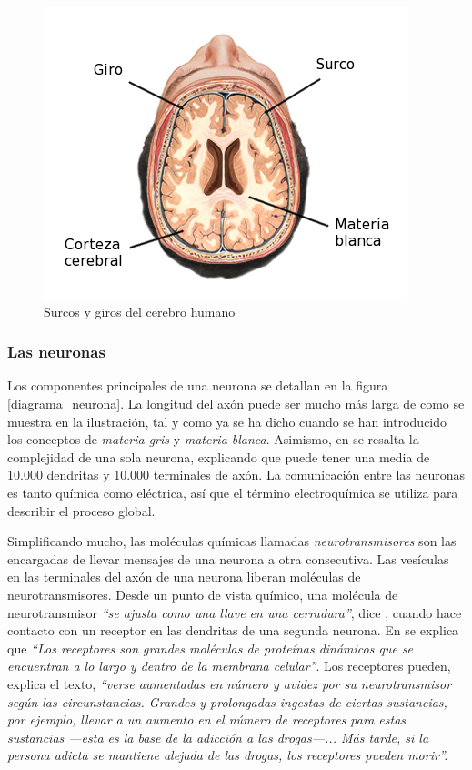 \begin{figure}[h]
  \begin{center}
    \includegraphics[scale=0.8]{images/surcosygiros.jpg}
    \caption{Surcos y giros del cerebro humano}
    \label{surcosygiros}
  \end{center}
\end{figure}

\subsubsection{Las neuronas}

Los componentes principales de una neurona se detallan en la figura \ref{diagrama_neurona}. La longitud del axón puede ser mucho más larga de como se muestra en la ilustración, tal y como ya se ha dicho cuando se han introducido los conceptos de {\it materia gris} y {\it materia blanca}. Asimismo, en \cite{Sapolsky} se resalta la complejidad de una sola neurona, explicando que puede tener una media de 10.000 dendritas y 10.000 terminales de axón. La comunicación entre las neuronas es tanto química como eléctrica, así que el término electroquímica se utiliza para describir el proceso global.

Simplificando mucho, las moléculas químicas llamadas  {\it neurotransmisores} son las encargadas de llevar mensajes de una neurona a otra consecutiva. Las vesículas en las terminales del axón de una neurona liberan moléculas de neurotransmisores. Desde un punto de vista químico, una molécula de neurotransmisor {\it ``se ajusta como una llave en una cerradura''}, dice \cite{Sapolsky}, cuando hace contacto con un receptor en las dendritas de una segunda neurona. En \cite{Restak1995} se explica que {\it ``Los receptores son grandes moléculas de proteínas dinámicos que se encuentran a lo largo y dentro de la membrana celular''}. Los receptores pueden, explica el texto, {\it ``verse aumentadas en número y avidez por su neurotransmisor según las circunstancias. Grandes y prolongadas ingestas de ciertas sustancias, por ejemplo, llevar a un aumento en el número de receptores para estas sustancias ---esta es la base de la adicción a las drogas---... Más tarde, si la persona adicta se mantiene alejada de las drogas, los receptores pueden morir''.}

